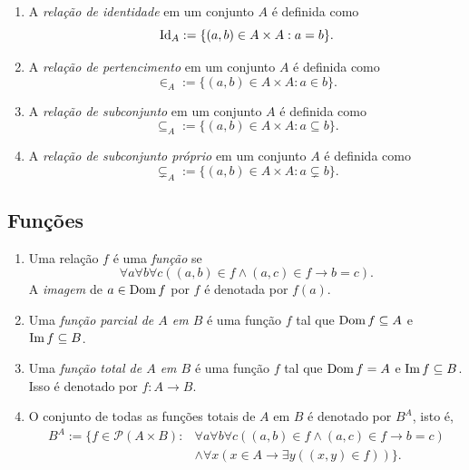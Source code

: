 \begin{definition}
    \leavevmode
        \begin{enumerate}[leftmargin=*, align=left, label=\textbf{(\alph*)}]
            \item A \emph{relação de identidade} em um conjunto $A$ é definida como
                \[
                    \operatorname{Id}_{A} := \{(a,b) \in A \times A : a = b\}.
                \]
            \item A \emph{relação de pertencimento} em um conjunto $A$ é definida como
                \[
                    \in_{A} := \{(a,b) \in A \times A : a \in b\}.
                \]
            \item A \emph{relação de subconjunto} em um conjunto $A$ é definida como
                \[
                    \subseteq_{A} := \{(a,b) \in A \times A : a \subseteq b\}.
                \]
            \item A \emph{relação de subconjunto próprio} em um conjunto $A$ é definida como
                \[
                    \subsetneq_{A} := \{(a,b) \in A \times A : a \subsetneq b\}.
                \]
        \end{enumerate}
\end{definition}

\subsection{Funções}

\begin{definition}[Função] \label{defi.set:função}
    \leavevmode
        \begin{enumerate}[leftmargin=*, align=left, label=\textbf{(\alph*)}]
            \item Uma relação $f$ é uma \emph{função} se
                \[
                    \forall a \forall b \forall c ((a,b) \in f \land (a,c) \in f \rightarrow b=c).
                \]
            A \emph{imagem} de $a \in \operatorname{Dom} f$ por $f$ é denotada por $f(a)$.
            \item Uma \emph{função parcial de $A$ em $B$} é uma função $f$ tal que $\operatorname{Dom} f \subseteq A$ e $\operatorname{Im} f \subseteq B$.
            \item Uma \emph{função total de $A$ em $B$} é uma função $f$ tal que $\operatorname{Dom} f = A$ e $\operatorname{Im} f \subseteq B$. Isso é denotado por $f : A \to B$.
            \item O conjunto de todas as funções totais de $A$ em $B$ é denotado por $B^{A}$, isto é,
                \begin{align*}
                    B^{A} := \{f \in \mathcal{P}{(A \times B)} : & \forall a \forall b \forall c ((a,b) \in f \land (a,c) \in f \rightarrow b=c) \\ 
                    & \land \forall x(x \in A \rightarrow \exists y((x,y) \in f)) \}.
                \end{align*}
        \end{enumerate}
\end{definition}

